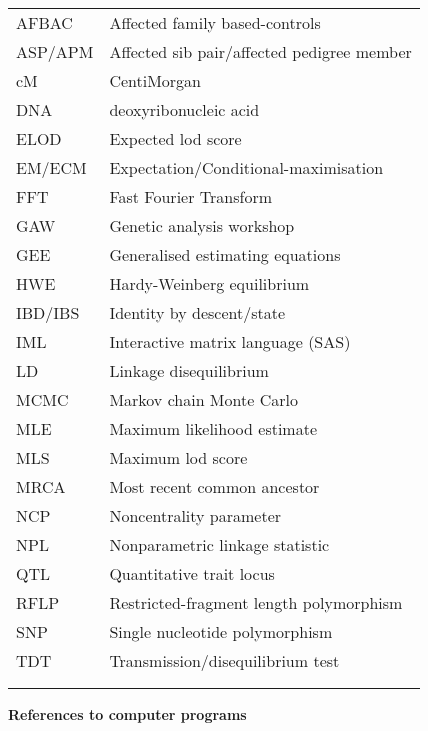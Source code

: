 \documentclass[11pt,a4paper]{iopthsis}
\begin{document}
\begin{tabular}{ll}
\\
AFBAC & Affected family based-controls \\
ASP/APM & Affected sib pair/affected pedigree member \\
cM & CentiMorgan \\
DNA & deoxyribonucleic acid \\
ELOD & Expected lod score \\
EM/ECM & Expectation/Conditional-maximisation \\
FFT & Fast Fourier Transform \\
GAW & Genetic analysis workshop \\
GEE & Generalised estimating equations \\
HWE & Hardy-Weinberg equilibrium \\
IBD/IBS & Identity by descent/state \\
IML & Interactive matrix language (SAS) \\
LD & Linkage disequilibrium \\
MCMC & Markov chain Monte Carlo \\
MLE & Maximum likelihood estimate \\
MLS & Maximum lod score \\
MRCA & Most recent common ancestor \\
NCP & Noncentrality parameter \\
NPL & Nonparametric linkage statistic \\
QTL & Quantitative trait locus \\
RFLP & Restricted-fragment length polymorphism\\
SNP & Single nucleotide polymorphism \\
TDT & Transmission/disequilibrium test \\
\\
\\
\end{tabular}

\newpage
{\bf\huge References to computer programs}
\end{document}
